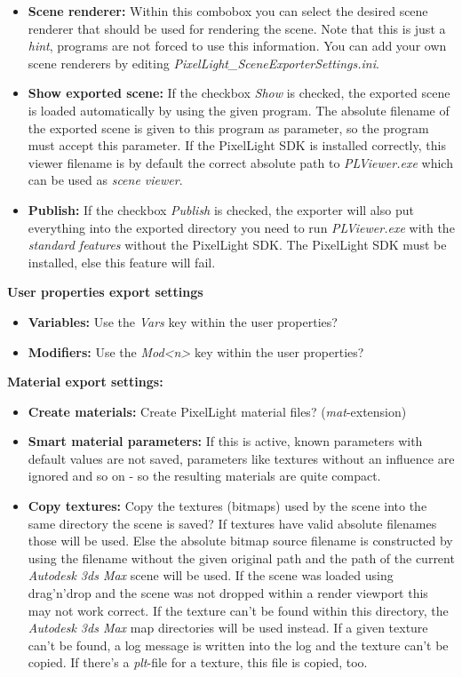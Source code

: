 \begin{itemize}
\item{\textbf{Scene renderer:} Within this combobox you can select the desired scene renderer that should be used for rendering the scene. Note that this is just a \emph{hint}, programs are not forced to use this information. You can add your own scene renderers by editing \emph{PixelLight\_SceneExporterSettings.ini}.}
\item{\textbf{Show exported scene:} If the checkbox \emph{Show} is checked, the exported scene is loaded automatically by using the given program. The absolute filename of the exported scene is given to this program as parameter, so the program must accept this parameter. If the PixelLight \ac{SDK} is installed correctly, this viewer filename is by default the correct absolute path to \emph{PLViewer.exe} which can be used as \emph{scene viewer}.}
\item{\textbf{Publish:} If the checkbox \emph{Publish} is checked, the exporter will also put everything into the exported directory you need to run \emph{PLViewer.exe} with the \emph{standard features} without the PixelLight \ac{SDK}. The PixelLight \ac{SDK} must be installed, else this feature will fail.}
\end{itemize}

\textbf{User properties export settings}
\begin{itemize}
\item{\textbf{Variables:} Use the \emph{Vars} key within the user properties?}
\item{\textbf{Modifiers:} Use the \emph{Mod<n>} key within the user properties?}
\end{itemize}

\textbf{Material export settings:}
\begin{itemize}
\item{\textbf{Create materials:} Create PixelLight material files? (\emph{mat}-extension)}
\item{\textbf{Smart material parameters:} If this is active, known parameters with default values are not saved, parameters like textures without an influence are ignored and so on - so the resulting materials are quite compact.}
\item{\textbf{Copy textures:} Copy the textures (bitmaps) used by the scene into the same directory the scene is saved? If textures have valid absolute filenames those will be used. Else the absolute bitmap source filename is constructed by using the filename without the given original path and the path of the current \emph{Autodesk 3ds Max} scene will be used. If the scene was loaded using drag'n'drop and the scene was not dropped within a render viewport this may not work correct. If the texture can't be found within this directory, the \emph{Autodesk 3ds Max} map directories will be used instead. If a given texture can't be found, a log message is written into the log and the texture can't be copied. If there's a \emph{plt}-file for a texture, this file is copied, too.}
\end{itemize}


